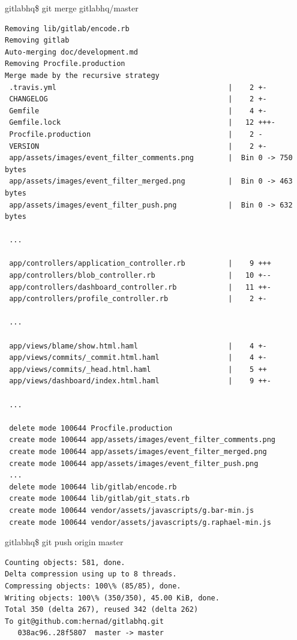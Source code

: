 gitlabhq\$ git merge gitlabhq/master

\begin{lstlisting}
Removing lib/gitlab/encode.rb
Removing gitlab
Auto-merging doc/development.md
Removing Procfile.production
Merge made by the recursive strategy
 .travis.yml                                        |    2 +-
 CHANGELOG                                          |    2 +-
 Gemfile                                            |    4 +-
 Gemfile.lock                                       |   12 +++-
 Procfile.production                                |    2 -
 VERSION                                            |    2 +-
 app/assets/images/event_filter_comments.png        |  Bin 0 -> 750 bytes
 app/assets/images/event_filter_merged.png          |  Bin 0 -> 463 bytes
 app/assets/images/event_filter_push.png            |  Bin 0 -> 632 bytes
 
 ...

 app/controllers/application_controller.rb          |    9 +++
 app/controllers/blob_controller.rb                 |   10 +--
 app/controllers/dashboard_controller.rb            |   11 ++-
 app/controllers/profile_controller.rb              |    2 +-

 ...

 app/views/blame/show.html.haml                     |    4 +-
 app/views/commits/_commit.html.haml                |    4 +-
 app/views/commits/_head.html.haml                  |    5 ++
 app/views/dashboard/index.html.haml                |    9 ++-
 
 ... 
 
 delete mode 100644 Procfile.production
 create mode 100644 app/assets/images/event_filter_comments.png
 create mode 100644 app/assets/images/event_filter_merged.png
 create mode 100644 app/assets/images/event_filter_push.png
 ...
 delete mode 100644 lib/gitlab/encode.rb
 create mode 100644 lib/gitlab/git_stats.rb
 create mode 100644 vendor/assets/javascripts/g.bar-min.js
 create mode 100644 vendor/assets/javascripts/g.raphael-min.js
\end{lstlisting}



gitlabhq\$ git push origin master

\begin{lstlisting}
Counting objects: 581, done.
Delta compression using up to 8 threads.
Compressing objects: 100\% (85/85), done.
Writing objects: 100\% (350/350), 45.00 KiB, done.
Total 350 (delta 267), reused 342 (delta 262)
To git@github.com:hernad/gitlabhq.git
   038ac96..28f5807  master -> master

\end{lstlisting}

